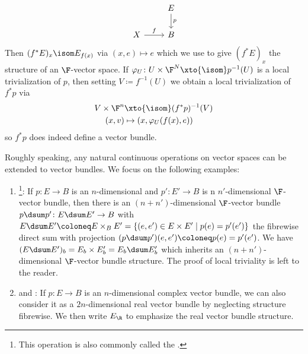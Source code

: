 \begin{definition}
\begin{enumerate}
\begin{equation*}
\begin{tikzcd}
						& E
						\ar[d, "p"]
						\\
						X
						\ar[r, "f"]
						& B
				\end{tikzcd}
			\end{equation*}
			Then $(f^* E)_x \isom E_{f(x)}$ via $(x, e) \mapsto e$ which we use to give $(f^* E)_x$ the structure of an $\F$-vector space.
			If $\varphi_U\colon U \times \F^N \xto{\isom} p^{-1}(U)$ is a local trivialization of $p$, then setting $V \coloneq f^{-1}(U)$ we obtain a local trivialization of $f^* p$ via
			\begin{align*}
				V \times \F^n &\xto{\isom} (f^* p)^{-1}(V) \\
				(x, v) &\mapsto (x, \varphi_U(f(x), e))
			\end{align*}
			so $f^* p$ does indeed define a vector bundle.
	\end{enumerate}
	Roughly speaking, any natural continuous operations on vector spaces can be extended to vector bundles.
	We focus on the following examples:
	\begin{enumerate}[resume]
		\item {}\footnote{This operation is also commonly called the .}:
			If $p\colon E \to B$ is an $n$-dimensional and $p'\colon E' \to B$ is n $n'$-dimensional $\F$-vector bundle, then there is an $(n + n')$-dimensional $\F$-vector bundle $p \dsum p'\colon E \dsum E' \to B$ with $E \dsum E' \coloneq E \times_B E' = \{(e, e') \in E \times E' \mid p(e) = p'(e')\}$ the fibrewise direct sum with projection $(p \dsum p')(e, e') \coloneq p(e) = p'(e')$.
			We have $(E \dsum E')_b = E_b \times E'_b = E_b \dsum E'_b$ which inherits an $(n + n')$-dimensional $\F$-vector bundle structure.
			The proof of local triviality is left to the reader.
		\item {} and :
			If $p\colon E \to B$ is an $n$-dimensional complex vector bundle, we can also consider it as a $2n$-dimensional real vector bundle by neglecting structure fibrewise.
			We then write $E_{\R}$ to emphasize the real vector bundle structure.


\end{enumerate}
\end{definition}

